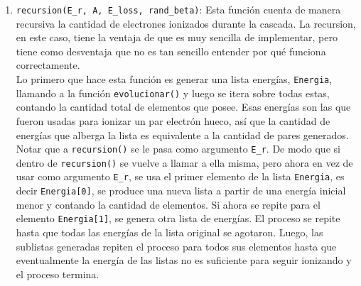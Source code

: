 \begin{enumerate}[label=\arabic*., listparindent=1.5em]
    \indent Una vez que se tienen estos valores, siempre y cuando se cumpla que la probabilidad de ionizacion \verb|p_eh| sea mayor que \verb|p_rand| y que al mismo tiempo la fracción de energía \verb|E_tranf| sea mayor que $3.75\,\si{eV}$\footnote{Condición que cobra gran relevancia en los resultados y se explica en más datella en la siguiente sección} (valor medio para la energía de creación electrón hueco $\varepsilon_{\eh}$), entonces se actualiza el valor de la energía inicial \verb|E_r| restándole la fracción de energía transferida. Además, también, se guardan en una lista la resta entre las energías transferidas \verb|E_r| y la energía perdida por ionización \verb|E_loss|. Esta última es un parámetro configurable de la simulación, en la cual se puede considerar el caso donde la energía se conserva y \verb|E_loss = 0| o el caso en el que no hay conservación de energía y \verb|E_loss|$\neq$\verb|0|. Notar que la cantidad de elementos de la lista será la cantidad de pares electrón-hueco generados por una rama de la cascada con energía inicial \verb|E_r|. Luego, cada elemento de la lista se transforma, para otra rama, en \verb|E_r|, generando una nueva lista. Repitiendo con todas las energías de toda la lista y todas las sublistas, se pueden contar los electrones ionizados.\\
    \indent De no cumplirse la condición del Montecarlo, el sistema pierde energía por emisión de fonones, es decir, la energía \verb|E_r| se actualiza restándole un valor fijo de energía $\hbar \omega = 0.063\,\si{eV}$. El resultado de esta función es una lista con las energías de una sola rama de la cascada.
    \item \verb|recursion(E_r, A, E_loss, rand_beta)|: Esta función cuenta de manera recursiva la cantidad de electrones ionizados durante la cascada. La recursion, en este caso, tiene la ventaja de que es muy sencilla de implementar, pero tiene como desventaja que no es tan sencillo entender por qué funciona correctamente.\\
    \indent Lo primero que hace esta función es generar una lista energías, \verb|Energia|, llamando a la función \verb|evolucionar()| y luego se itera sobre todas estas, contando la cantidad total de elementos que posee. Esas energías son las que fueron usadas para ionizar un par electrón hueco, así que la cantidad de energías que alberga la lista es equivalente a la cantidad de pares generados. Notar que a \verb|recursion()| se le pasa como argumento \verb|E_r|. De modo que si dentro de \verb|recursion()| se vuelve a llamar a ella misma, pero ahora en vez de usar como argumento \verb|E_r|, se usa el primer elemento de la lista \verb|Energia|, es decir \verb|Energia[0]|, se produce una nueva lista a partir de una energía inicial menor y contando la cantidad de elementos. Si ahora se repite para el elemento \verb|Energia[1]|, se genera otra lista de energías. El proceso se repite hasta que todas las energías de la lista original se agotaron. Luego, las sublistas generadas repiten el proceso para todos sus elementos hasta que eventualmente la energía de las listas no es suficiente para seguir ionizando y el proceso termina.\\

\end{enumerate}
